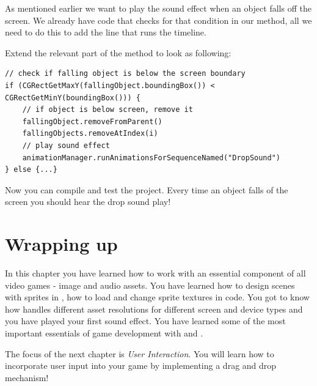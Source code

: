 As mentioned earlier we want to play the sound effect when an object falls off
the screen. We already have code that checks for that condition in our
 method, all we need to do this to add the line that runs the
timeline. 

\begin{leftbar}
Extend the relevant part of the  method to look as
following:
\begin{lstlisting}
// check if falling object is below the screen boundary
if (CGRectGetMaxY(fallingObject.boundingBox()) < CGRectGetMinY(boundingBox())) {
	// if object is below screen, remove it
    fallingObject.removeFromParent()
    fallingObjects.removeAtIndex(i)
    // play sound effect
    animationManager.runAnimationsForSequenceNamed("DropSound")
} else {...}
\end{lstlisting}
\end{leftbar}

Now you can compile and test the project. Every time an object falls of the
screen you should hear the drop sound play!

\section{Wrapping up}
In this chapter you have learned how to work with an essential component of all
video games - image and audio assets. You have learned how to design scenes with
sprites in \SB{}, how to load and change sprite textures in code. You got to
know how \SB{} handles different asset resolutions for different screen and
device types and you have played your first sound effect. You have learned some
of the most important essentials of game development with \SB{} and \cocos{}.

The focus of the next chapter is \textit{User Interaction}. You will learn how
to incorporate user input into your game by implementing a drag and drop
mechanism!